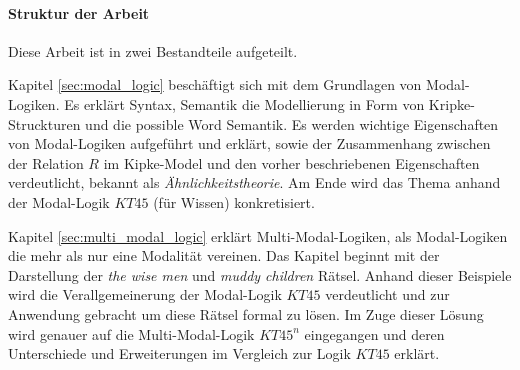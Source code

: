 
\paragraph{Struktur der Arbeit} %
\label{par:struktur_der_arbeit}

Diese Arbeit ist in zwei Bestandteile aufgeteilt. 

Kapitel \ref{sec:modal_logic} beschäftigt sich mit dem Grundlagen von Modal-Logiken. 
Es erklärt Syntax, Semantik die Modellierung in Form von Kripke-Struckturen und die possible Word Semantik. 
Es werden wichtige Eigenschaften von Modal-Logiken aufgeführt und erklärt, sowie der Zusammenhang zwischen der Relation $R$ im Kipke-Model und den vorher beschriebenen Eigenschaften verdeutlicht, bekannt als \emph{Ähnlichkeitstheorie}.
Am Ende wird das Thema anhand der Modal-Logik $KT45$ (für Wissen) konkretisiert.

Kapitel \ref{sec:multi_modal_logic} erklärt Multi-Modal-Logiken, als Modal-Logiken die mehr als nur eine Modalität vereinen. Das Kapitel beginnt mit der Darstellung der \emph{the wise men} und \emph{muddy children} Rätsel. 
Anhand dieser Beispiele wird die Verallgemeinerung der Modal-Logik $KT45$ verdeutlicht und zur Anwendung gebracht um diese Rätsel formal zu lösen.
Im Zuge dieser Lösung wird genauer auf die Multi-Modal-Logik $KT45^n$ eingegangen und deren Unterschiede und Erweiterungen im Vergleich zur Logik $KT45$ erklärt.





